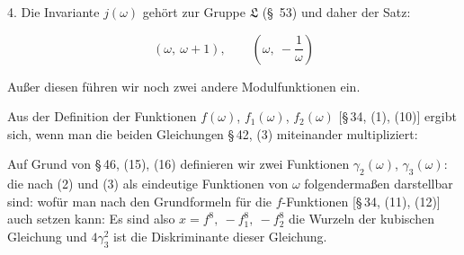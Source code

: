 4. Die Invariante $j(\omega)$ gehört zur Gruppe $\mathfrak{L}$ (\S\ 53) und
daher der Satz:

\[
(\omega,\ \omega+1), \qquad \left(\omega,\ -\frac{1}{\omega}\right)
\]

Außer diesen führen wir noch zwei andere Modulfunktionen
ein.

Aus der Definition der Funktionen $f(\omega)$, $f_1(\omega)$, $f_2(\omega)$ [\S\,34,
(1), (10)] ergibt sich, wenn man die beiden Gleichungen \S\,42, (3)
miteinander multipliziert:

Auf Grund von \S\,46, (15), (16) definieren wir zwei Funktionen
 $\gamma_2(\omega)$, $\gamma_3(\omega)$:
die nach (2) und (3) als eindeutige Funktionen von $\omega$ folgendermaßen
 darstellbar sind:
wofür man nach den Grundformeln für die $f$-Funktionen [\S\,34,
(11), (12)] auch setzen kann:
Es sind also $x = f^8,\ -f_1^8,\ -f_2^8$ die Wurzeln der kubischen
Gleichung
und $4\gamma_3^2$ ist die Diskriminante dieser Gleichung.
